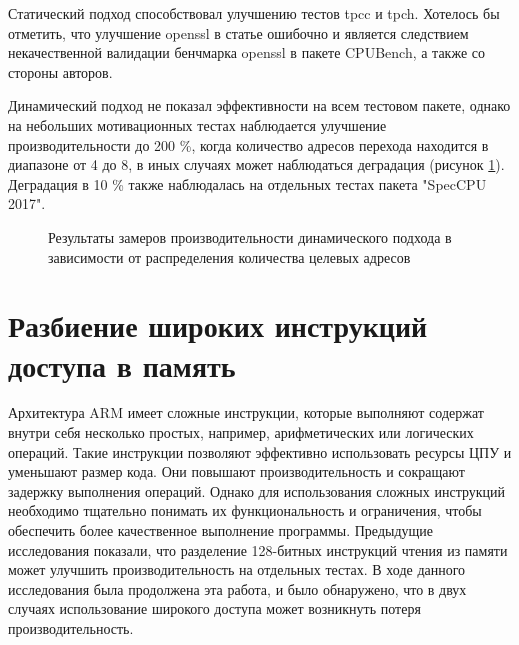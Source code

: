 
Статический подход способствовал улучшению тестов tpcc и tpch. Хотелось бы отметить, что улучшение openssl в статье \cite{chernonog2023статический} ошибочно и является следствием некачественной валидации бенчмарка openssl в пакете CPUBench, а также со стороны авторов.

Динамический подход не показал эффективности на всем тестовом пакете, однако на небольших мотивационных тестах  наблюдается улучшение производительности до 200 \%, когда количество адресов перехода находится в диапазоне от 4 до 8, в иных случаях может наблюдаться деградация (рисунок  \ref{fig:ICP2}). Деградация в 10 \% также наблюдалась на отдельных тестах пакета "SpecCPU 2017"\phantom{}.

\begin{figure}[ht]
	\caption{Результаты замеров производительности динамического подхода в зависимости от распределения количества целевых адресов}\label{fig:ICP2}
\end{figure}


 \section {Разбиение широких инструкций доступа в память} \label{ch2:split_ldp_stp}
Архитектура ARM имеет сложные инструкции, которые выполняют содержат внутри себя несколько простых, например, арифметических или логических операций. Такие инструкции позволяют эффективно использовать ресурсы ЦПУ и уменьшают размер кода. Они повышают производительность и сокращают задержку выполнения операций. Однако для использования сложных инструкций необходимо тщательно понимать их функциональность и ограничения, чтобы обеспечить более качественное выполнение программы. Предыдущие исследования \cite{park2019microarchitecture} показали, что разделение 128-битных инструкций чтения из памяти  может улучшить производительность на отдельных тестах. В ходе данного исследования была продолжена эта работа, и было обнаружено, что в двух случаях использование широкого доступа может возникнуть потеря производительность.

